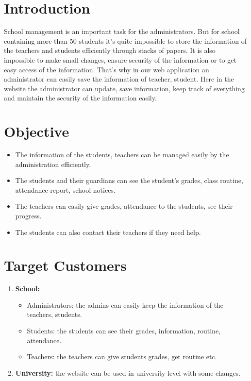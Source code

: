 \documentclass[12pt]{article}
\begin{document}



\section*{Introduction}

School management is an important task for the administrators. But for school containing more than 50 students it’s quite impossible to store the information of the teachers and students efficiently through stacks of papers. It is also impossible to make small changes, ensure security of the information or to get easy access of the information. That’s why in our web application an administrator can easily save the information of teacher, student. Here in the website the administrator can update, save information, keep track of everything and maintain the security of the information easily. 


\section*{Objective}

\begin{itemize}
  \item The information of the students, teachers can be managed easily by the administration efficiently.
  \item The students and their guardians can see the student’s grades, class routine, attendance report, school notices.
  \item The teachers can easily give grades, attendance to the students, see their progress.
  \item The students can also contact their teachers if they need help.
\end{itemize}

\section*{Target Customers}

\begin{enumerate}
  \item \textbf{School:} 
  \begin{itemize}
    \item Administrators: the admins can easily keep the information of the teachers, students.
    \item Students: the students can see their grades, information, routine, attendance.
    \item Teachers: the teachers can give students grades, get routine etc.

  \end{itemize}
  \item \textbf{University:} the website can be used in university level with some changes.
\end{enumerate}
\end{document}

